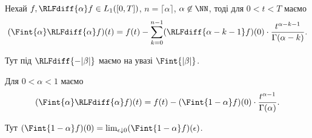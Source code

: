 \begin{th_formula}
        Нехай $f, \RLFdiff{\alpha} f \in L_1([0,T])$, $n = \lceil \alpha \rceil$, $\alpha \not\in \NN$, тоді для $0 < t < T$ маємо
    \begin{equation}
        (\Fint{\alpha} \RLFdiff{\alpha} f)(t) = f(t) - \sum_{k = 0}^{n - 1} (\RLFdiff{\alpha - k  - 1} f)(0) \cdot \frac{t^{\alpha - k - 1}}{\Gamma(\alpha - k)}.
    \end{equation}
\end{th_formula}

\begin{remark}
    Тут під $\RLFdiff{-|\beta|}$ маємо на увазі $\Fint{|\beta|}$.
\end{remark}

\begin{example}
    Для $0 < \alpha < 1$ маємо
    \begin{equation}
        (\Fint{\alpha} \RLFdiff{\alpha} f)(t) = f(t) - (\Fint{1 - \alpha} f)(0) \cdot \frac{t^{\alpha - 1}}{\Gamma(\alpha)}.
    \end{equation}
\end{example}

\begin{remark}
    Тут $(\Fint{1 - \alpha} f)(0) = \lim_{\epsilon \downarrow 0} (\Fint{1 - \alpha} f)(\epsilon)$.
\end{remark}

